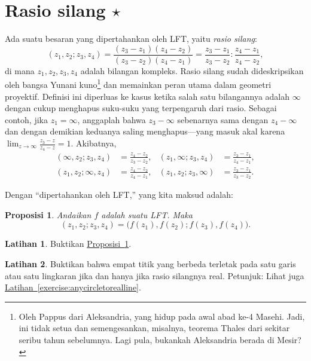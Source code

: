 \documentclass[12pt,openany]{book}
\newcommand{\myindex}[1]{#1\index{#1}}
\newcommand{\myquote}[1]{``#1''}
\theoremstyle{plain}
\newtheorem{prop}[thm]{Proposisi}
\theoremstyle{remark}
\theoremstyle{definition}
\newenvironment{exbox}{%
    \def\FrameCommand{\vrule width 1pt \relax\hspace{10pt}}%
    \MakeFramed{\advance\hsize-\width\FrameRestore}%
}{%
    \endMakeFramed
}
\theoremstyle{exercise}
\newtheorem{exercise}{Latihan}[section]
\theoremstyle{example}
\newcommand{\exerciseref}[1]{\hyperref[#1]{Latihan~\ref*{#1}}}
\newcommand{\propref}[1]{\hyperref[#1]{Proposisi~\ref*{#1}}}
\begin{document}
\section{Rasio silang \texorpdfstring{$\star$}{*}}

Ada suatu besaran yang dipertahankan oleh LFT, yaitu
\emph{\myindex{rasio silang}}:
%
\begin{equation*}
(z_1,z_2;z_3,z_4)
=
\frac{(z_3-z_1)(z_4-z_2)}{(z_3-z_2)(z_4-z_1)}
=
\frac{z_3-z_1}{z_3-z_2} : 
\frac{z_4-z_1}{z_4-z_2} ,
\end{equation*}
di mana $z_1,z_2,z_3,z_4$ adalah bilangan kompleks.  Rasio silang
sudah dideskripsikan oleh bangsa Yunani kuno\footnote{Oleh
Pappus dari Aleksandria, yang
hidup pada awal abad ke-4 Masehi\@.  Jadi, ini tidak setua dan semengesankan,
misalnya,
teorema Thales dari sekitar seribu tahun sebelumnya.  Lagi pula, bukankah
Aleksandria berada di Mesir?}
dan memainkan peran utama dalam geometri proyektif.
Definisi ini diperluas ke kasus ketika salah satu bilangannya adalah $\infty$ dengan cukup
menghapus suku-suku yang terpengaruh dari rasio.  Sebagai contoh, jika $z_1=\infty$,
anggaplah bahwa $z_3-\infty$
sebenarnya sama dengan $z_4-\infty$ dan
dengan demikian keduanya saling menghapus---yang masuk akal karena $\lim_{z\to\infty} \frac{z_3-z}{z_4-z} = 1$.
Akibatnya,
\begin{align*}
(\infty,z_2;z_3,z_4)
& =
\frac{z_4-z_2}{z_3-z_2}
,
&
(z_1,\infty;z_3,z_4)
& =
\frac{z_3-z_1}{z_4-z_1}
,
\\
(z_1,z_2;\infty,z_4)
& =
\frac{z_4-z_2}{z_4-z_1}
,
& 
(z_1,z_2;z_3,\infty)
& =
\frac{z_3-z_1}{z_3-z_2} .
\end{align*}

Dengan \myquote{dipertahankan oleh LFT,} yang kita maksud adalah:

\begin{prop} \label{prop:crossratioinvariant}
Andaikan $f$ adalah suatu LFT\@.  Maka
\begin{equation*}
(z_1,z_2;z_3,z_4) =
\bigl(f(z_1),f(z_2);f(z_3),f(z_4)\bigr) .
\end{equation*}
\end{prop}

\begin{exbox}
\begin{exercise}
Buktikan \propref{prop:crossratioinvariant}.
\end{exercise}

\begin{exercise}
Buktikan bahwa empat titik yang berbeda terletak pada satu garis atau satu lingkaran jika dan hanya jika
rasio silangnya real.
Petunjuk: Lihat juga \exerciseref{exercise:anycircletorealline}.
\end{exercise}
\end{exbox}
\end{document}
